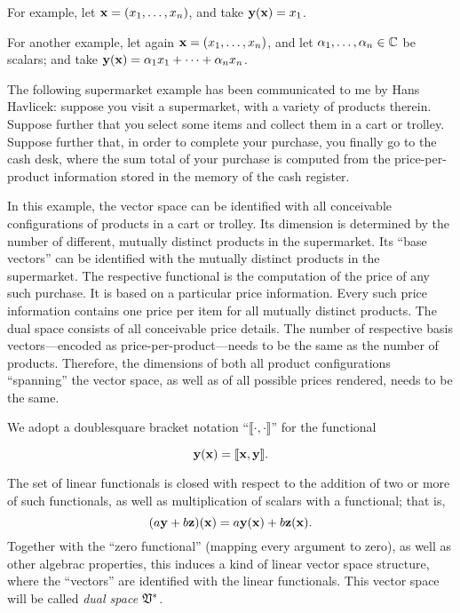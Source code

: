 {\color{blue}
\bexample
For example,
let ${\bf x} = (x_1,\ldots , x_n)$, and
take
${\bf y} ({\bf x}) =x_1$.

For another example,
let again ${\bf x} = (x_1,\ldots , x_n)$, and
let $\alpha_1,\ldots , \alpha_n \in {\Bbb C}$ be scalars; and
take
${\bf y} ({\bf x}) =\alpha_1 x_1 + \cdots +\alpha_n x_n$.

The following supermarket example has been
communicated to me by Hans Havlicek:\cite{havlicek-priv3}
suppose you visit a supermarket, with a variety of products therein.
Suppose further that you select some items and collect them in a cart or trolley.
Suppose further that, in order to complete your purchase, you finally go to the cash desk,
where the sum total of your purchase is computed from the price-per-product information stored
in the memory of the cash register.

In this example, the vector space can be identified with all conceivable configurations of products in a cart or trolley.
Its dimension is determined by the number of different, mutually distinct products in the supermarket.
Its ``base vectors'' can be identified with the mutually distinct products in the supermarket.
The respective functional is the computation of the price of any such purchase.
It is based on a particular price information.
Every such price information contains one price per item for all mutually distinct products.
The dual space consists of all conceivable price details.
The number of respective basis vectors---encoded as price-per-product---needs to be the same as the number of products.
Therefore, the dimensions of both all product configurations ``spanning'' the vector space,
as well as of all possible prices rendered, needs to be the same.
\eexample
}


We adopt a doublesquare bracket notation ``$\llbracket \cdot , \cdot \rrbracket$''
for the functional


\begin{equation}
{\bf y} ({\bf x})
=
\llbracket {\bf x},{\bf y}\rrbracket .
\end{equation}

The set of linear functionals is closed with respect to
the addition of two or more of such functionals, as well as multiplication of scalars with a functional;
that is,
\begin{equation}
(a {\bf y} + b {\bf z}) ({\bf x})
=
  a {\bf y} ({\bf x}) + b {\bf z} ({\bf x})
.
\end{equation}
Together with the ``zero functional''
(mapping every argument to zero), as well as other algebrac properties,
this induces a kind of linear vector space structure, where the ``vectors''
are identified with the linear functionals.
This vector space will be called {\em dual space} ${\frak V}^\ast $.


